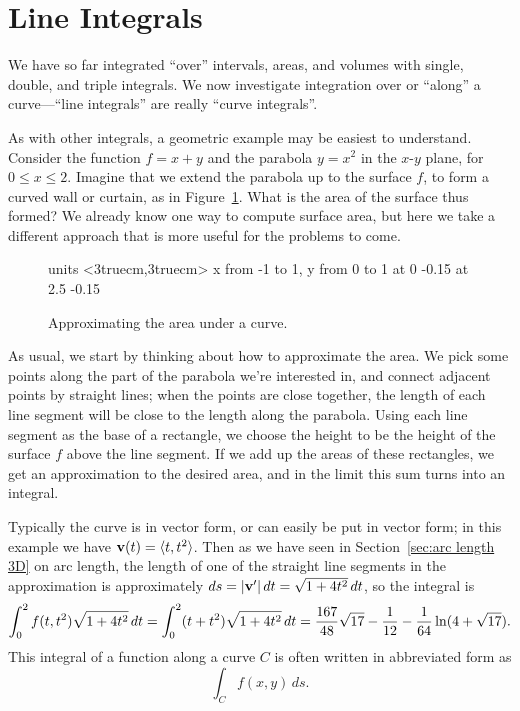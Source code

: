 \section{Line Integrals}\label{sec:LineIntegrals}

We have so far integrated ``over'' intervals, areas, and volumes with
single, double, and triple integrals. We now investigate integration
over or ``along'' a curve---``line integrals''
are really ``curve integrals''.

As with other integrals, a geometric example may be easiest to
understand. Consider the function $f=x+y$ and the parabola $y=x^2$ in
the $x$-$y$ plane, for $0\le x\le 2$. Imagine that we extend the
parabola up to the surface $f$, to form a curved wall or curtain, as
in Figure~\ref{fig:curtain}.  What is the area of the surface thus
formed? We already know one way to compute surface area, but here we
take a different approach that is more useful for the
problems to come.

\begin{figure}[H]
\centerline{
\vbox{\beginpicture
\normalgraphs
\setcoordinatesystem units <3truecm,3truecm>
\setplotarea x from -1 to 1, y from 0 to 1
 at 0 -0.15
 at 2.5 -0.15
\endpicture}}
\caption{Approximating the area under a curve. \label{fig:curtain}}
\end{figure}

As usual, we start by thinking about how to approximate the area. We
pick some points along the part of the parabola we're interested in,
and connect adjacent points by straight lines; when the points are
close together, the length of each line segment will be close to the
length along the parabola. Using each line segment as the base of a
rectangle, we choose the height to be the height of the surface $f$
above the line segment. If we add up the areas of these rectangles, we
get an approximation to the desired area, and in the limit this sum
turns into an integral.

Typically the curve is in vector form, or can easily be put in vector
form; in this example we have ${\bf v}(t)=\langle t,t^2\rangle$. Then as
we have seen in Section~\ref{sec:arc length 3D} on arc length, the
length of one of the straight line segments in the approximation is
approximately $ds=|{\bf v}'|\,dt=\sqrt{1+4t^2}\,dt$, so the integral is
$$\int_0^2 f(t,t^2)\sqrt{1+4t^2}\,dt
=\int_0^2 (t+t^2)\sqrt{1+4t^2}\,dt=
{167\over48}\sqrt{17}-{1\over12}-{1\over64}\ln(4+\sqrt{17}).
$$
This integral of a function along a curve $C$ is often written in
abbreviated form as
$$\int_C f(x,y)\,ds.$$

